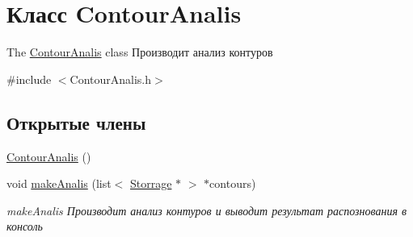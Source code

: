 \hypertarget{class_contour_analis}{\section{Класс Contour\+Analis}
\label{class_contour_analis}
}


The \hyperlink{class_contour_analis}{Contour\+Analis} class Производит анализ контуров  




{\ttfamily \#include $<$Contour\+Analis.\+h$>$}

\subsection*{Открытые члены}
\begin{DoxyCompactItemize}
\item 
\hyperlink{class_contour_analis_afb230c8f15afd848b467916f16c1681a}{Contour\+Analis} ()
\item 
void \hyperlink{class_contour_analis_a8c398a82aced99e9e44b378743652a90}{make\+Analis} (list$<$ \hyperlink{class_storrage}{Storrage} $\ast$ $>$ $\ast$contours)
\begin{DoxyCompactList}\small\item\em make\+Analis Производит анализ контуров и выводит результат распознования в консоль \end{DoxyCompactList}\end{DoxyCompactItemize}
